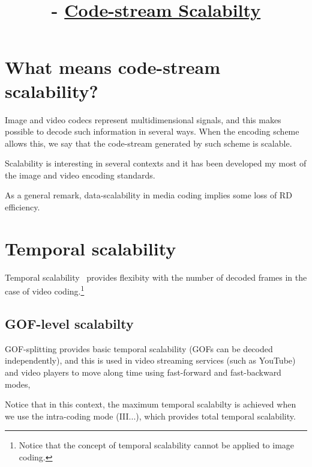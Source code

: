 


\title{\SM{} -  \href{https://github.com/Sistemas-Multimedia/Sistemas-Multimedia.github.io/tree/master/contents/data_scalability}{Code-stream Scalabilty}}

\maketitle
\tableofcontents

\section{What means code-stream scalability?}

Image and video codecs represent multidimensional signals, and this
makes possible to decode such information in several ways. When the
encoding scheme allows this, we say that the code-stream generated by
such scheme is scalable.

Scalability is interesting in several contexts and it has been
developed my most of the image and video encoding standards.

As a general remark, data-scalability in media coding implies some
loss of RD efficiency.


\section{Temporal scalability}


Temporal scalability~\cite{vruiz__video_scalability} provides
flexibity with the number of decoded frames in the case of video
coding.\footnote{Notice that the concept of temporal scalability
  cannot be applied to image coding.}

\subsection{GOF-level scalabilty}
GOF-splitting provides basic temporal scalability (GOFs can be decoded
independently), and this is used in video streaming services (such as
YouTube) and video players to move along time using fast-forward and
fast-backward modes,
  
Notice that in this context, the maximum temporal scalabilty is
achieved when we use the intra-coding mode (III...), which provides
total temporal scalability.

